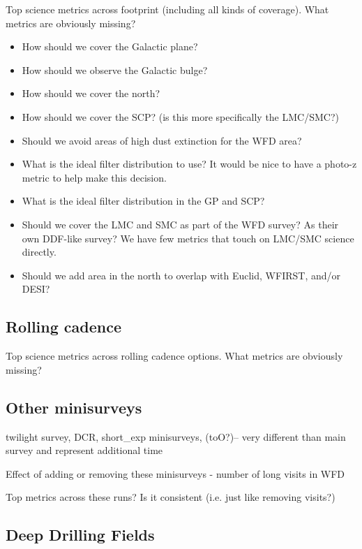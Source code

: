 Top science metrics across footprint (including all kinds of coverage). 
What metrics are obviously missing?

\begin{itemize}
    \item{How should we cover the Galactic plane?}
    \item{How should we observe the Galactic bulge?}
    \item{How should we cover the north?}
    \item{How should we cover the SCP? (is this more specifically the LMC/SMC?)}
    \item{Should we avoid areas of high dust extinction for the WFD area?}
    \item{What is the ideal filter distribution to use? It would be nice to have a photo-z metric to help make this decision.}
    \item{What is the ideal filter distribution in the GP and SCP?}
    \item{Should we cover the LMC and SMC as part of the WFD survey? As their own DDF-like survey? We have few metrics that touch on LMC/SMC science directly.}
    \item{Should we add area in the north to overlap with Euclid, WFIRST, and/or DESI?}
\end{itemize}


\subsection{Rolling cadence}

Top science metrics across rolling cadence options. 
What metrics are obviously missing?


\subsection{Other minisurveys}

twilight survey, DCR, short\_exp minisurveys, (toO?)-- very different than main survey and represent additional time

Effect of adding or removing these minisurveys - number of long visits in WFD



Top metrics across these runs? Is it consistent (i.e. just like removing visits?)


\subsection{Deep Drilling Fields}


